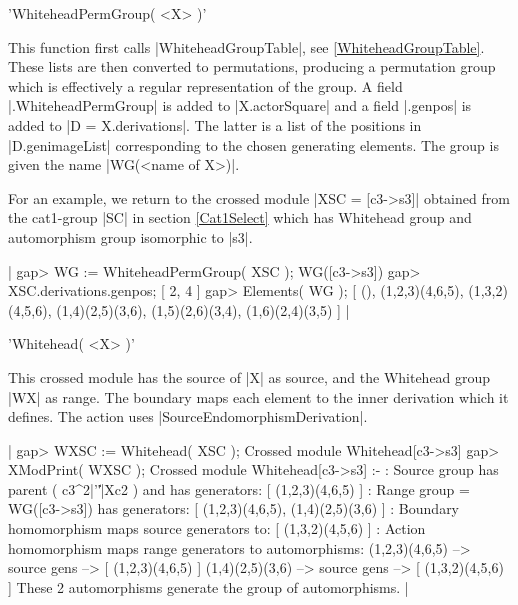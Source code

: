 {%
%

'WhiteheadPermGroup( <X> )'

This function first calls |WhiteheadGroupTable|, see \ref{WhiteheadGroupTable}.
These lists are then converted to permutations, producing
a permutation group which is effectively a regular representation
of the group.   
A field  |.WhiteheadPermGroup|  is added to  |X.actorSquare|
and a field  |.genpos|  is added to |D = X.derivations|.  
The latter is a list of the positions in |D.genimageList|
corresponding to the chosen generating elements.
The group is given the name |WG(<name of X>)|.

For an example, we return to the crossed module |XSC = [c3->s3]|
obtained from the cat1-group |SC| in section  \ref{Cat1Select}
which has Whitehead group and automorphism group isomorphic to |s3|.

|    gap> WG := WhiteheadPermGroup( XSC );
    WG([c3->s3])
    gap> XSC.derivations.genpos;
    [ 2, 4 ]
    gap> Elements( WG );
    [ (), (1,2,3)(4,6,5), (1,3,2)(4,5,6), (1,4)(2,5)(3,6),
      (1,5)(2,6)(3,4), (1,6)(2,4)(3,5) ]  |

%

'Whitehead( <X> )'

This crossed module has the source of |X| as source, and the Whitehead
group |WX| as range.  The boundary maps each element to the inner derivation 
which it defines.  The action uses |SourceEndomorphismDerivation|.

|    gap> WXSC := Whitehead( XSC );
    Crossed module Whitehead[c3->s3]
    gap> XModPrint( WXSC );
    Crossed module Whitehead[c3->s3] :- 
    : Source group has parent ( c3^2|'\|'|Xc2 ) and has generators:
      [ (1,2,3)(4,6,5) ]
    : Range group = WG([c3->s3]) has generators:
      [ (1,2,3)(4,6,5), (1,4)(2,5)(3,6) ]
    : Boundary homomorphism maps source generators to:
      [ (1,3,2)(4,5,6) ]
    : Action homomorphism maps range generators to automorphisms:
      (1,2,3)(4,6,5) --> { source gens --> [ (1,2,3)(4,6,5) ] }
      (1,4)(2,5)(3,6) --> { source gens --> [ (1,3,2)(4,5,6) ] }
      These 2 automorphisms generate the group of automorphisms.  |

%

}
